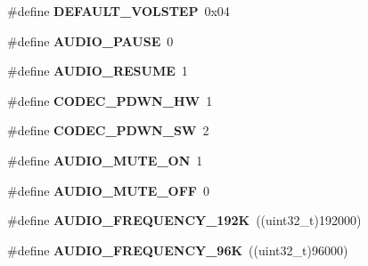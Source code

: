 \begin{DoxyCompactItemize}
\#define {\bfseries D\+E\+F\+A\+U\+L\+T\+\_\+\+V\+O\+L\+S\+T\+EP}~0x04
\item 
\mbox{\label{group___c_s43_l22___exported___constants_ga6484f3329a5e97697e77d3fdd7ded7bf}} 
\#define {\bfseries A\+U\+D\+I\+O\+\_\+\+P\+A\+U\+SE}~0
\item 
\mbox{\label{group___c_s43_l22___exported___constants_gac93f79efb33d48107476e201d1700b01}} 
\#define {\bfseries A\+U\+D\+I\+O\+\_\+\+R\+E\+S\+U\+ME}~1
\item 
\mbox{\label{group___c_s43_l22___exported___constants_ga0ce4f5b4e4b788d3c8bab978cbb43f54}} 
\#define {\bfseries C\+O\+D\+E\+C\+\_\+\+P\+D\+W\+N\+\_\+\+HW}~1
\item 
\mbox{\label{group___c_s43_l22___exported___constants_gac6f1efedf9778af4d6b5a24aa4007cbc}} 
\#define {\bfseries C\+O\+D\+E\+C\+\_\+\+P\+D\+W\+N\+\_\+\+SW}~2
\item 
\mbox{\label{group___c_s43_l22___exported___constants_ga739f1985e5705aa5441285b016ad3f16}} 
\#define {\bfseries A\+U\+D\+I\+O\+\_\+\+M\+U\+T\+E\+\_\+\+ON}~1
\item 
\mbox{\label{group___c_s43_l22___exported___constants_ga39c183dd43d448a80ffc6477152c870d}} 
\#define {\bfseries A\+U\+D\+I\+O\+\_\+\+M\+U\+T\+E\+\_\+\+O\+FF}~0
\item 
\mbox{\label{group___c_s43_l22___exported___constants_gae57e8d52f9b910efb5c5e2b5339c9e8d}} 
\#define {\bfseries A\+U\+D\+I\+O\+\_\+\+F\+R\+E\+Q\+U\+E\+N\+C\+Y\+\_\+192K}~((uint32\+\_\+t)192000)
\item 
\mbox{\label{group___c_s43_l22___exported___constants_ga4a9d8cc6e08cebe99d8f68a6114e3dc7}} 
\#define {\bfseries A\+U\+D\+I\+O\+\_\+\+F\+R\+E\+Q\+U\+E\+N\+C\+Y\+\_\+96K}~((uint32\+\_\+t)96000)
\item 
\mbox{\label{group___c_s43_l22___exported___constants_gab7513a26e3a3298a69be490ca8c49381}} 

\end{DoxyCompactItemize}
